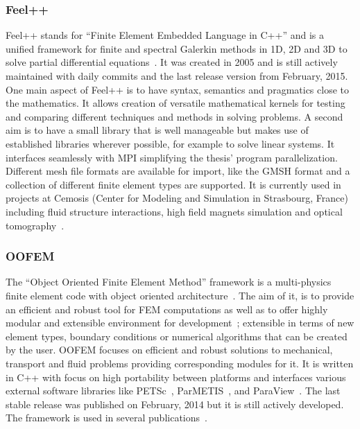   \subsubsection{Feel++}
  Feel++ stands for ``Finite Element Embedded Language in C++'' and is a unified framework for finite and spectral Galerkin methods in 1D, 2D and 3D to solve partial differential equations~\cite{prud2012feel++}. It was created in 2005 and is still actively maintained with daily commits and the last release version from February, 2015. One main aspect of Feel++ is to have syntax, semantics and pragmatics close to the mathematics. It allows creation of versatile mathematical kernels for testing and comparing different techniques and methods in solving problems. A second aim is to have a small library that is well manageable but makes use of established libraries wherever possible, for example to solve linear systems. It interfaces seamlessly with MPI simplifying the thesis' program parallelization. Different mesh file formats are available for import, like the GMSH format and a collection of different finite element types are supported. It is currently used in projects at Cemosis (Center for Modeling and Simulation in Strasbourg, France) including fluid structure interactions, high field magnets simulation and optical tomography~\cite{feelpp}.


  \subsubsection{OOFEM}
  The ``Object Oriented Finite Element Method'' framework is a multi-physics finite element code with object oriented architecture~\cite{patzak2001design}. The aim of it, is to provide an efficient and robust tool for FEM computations as well as to offer highly modular and extensible environment for development~\cite{oofem}; extensible in terms of new element types, boundary conditions or numerical algorithms that can be created by the user. OOFEM focuses on efficient and robust solutions to mechanical, transport and fluid problems providing corresponding modules for it. It is written in C++ with focus on high portability between platforms and interfaces various external software libraries like PETSc~\cite{petsc-web-page}, ParMETIS~\cite{karypis1998fast}, and ParaView~\cite{ahrens2005paraview}. The last stable release was published on February, 2014 but it is still actively developed. The framework is used in several publications~\cite{oofemPubs}.
  
  
  
